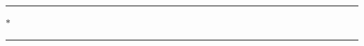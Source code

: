 \begin{center}
	\vspace{1em}
	\rule{0.15\textwidth}{0.4pt}\hfill$\ast$\hfill\rule{0.15\textwidth}{0.4pt}
	\vspace{1em}
\end{center}